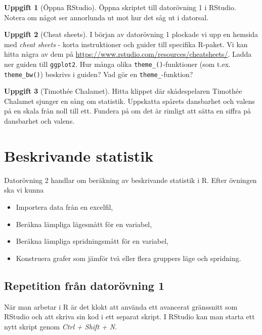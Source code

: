 \documentclass[
]{book}
\theoremstyle{definition}
\theoremstyle{definition}
\theoremstyle{definition}
\newtheorem{exercise}{Uppgift}[chapter]
\theoremstyle{definition}
\theoremstyle{remark}
\begin{document}
\begin{exercise}[Öppna RStudio]
Öppna skriptet till datorövning 1 i RStudio. Notera om något ser annorlunda ut mot hur det såg ut i datorsal.
\end{exercise}

\begin{exercise}[Cheat sheets]
I början av datorövning 1 plockade vi upp en hemsida med \emph{cheat sheets} - korta instruktioner och guider till specifika R-paket. Vi kan hitta några av dem på \url{https://www.rstudio.com/resources/cheatsheets/}.
Ladda ner guiden till \texttt{ggplot2}. Hur många olika \texttt{theme\_()}-funktioner (som t.ex. \texttt{theme\_bw()}) beskrivs i guiden? Vad gör en \texttt{theme\_}-funktion?
\end{exercise}

\begin{exercise}[Timothée Chalamet]
Hitta klippet där skådespelaren Timothée Chalamet sjunger en sång om statistik. Uppskatta spårets dansbarhet och valens på en skala från noll till ett. Fundera på om det är rimligt att sätta en siffra på dansbarhet och valens.
\end{exercise}

\hypertarget{beskrivande-statistik}{%
\chapter{Beskrivande statistik}\label{beskrivande-statistik}}

Datorövning 2 handlar om beräkning av beskrivande statistik i R. Efter övningen ska vi kunna

\begin{itemize}
\item
  Importera data från en excelfil,
\item
  Beräkna lämpliga lägesmått för en variabel,
\item
  Beräkna lämpliga spridningsmått för en variabel,
\item
  Konstruera grafer som jämför två eller flera gruppers läge och spridning.
\end{itemize}

\hypertarget{repetition-fruxe5n-datoruxf6vning-1}{%
\section{Repetition från datorövning 1}\label{repetition-fruxe5n-datoruxf6vning-1}}

När man arbetar i R är det klokt att använda ett avancerat gränssnitt som RStudio och att skriva sin kod i ett separat skript. I RStudio kan man starta ett nytt skript genom \emph{Ctrl + Shift + N}.
\end{document}
